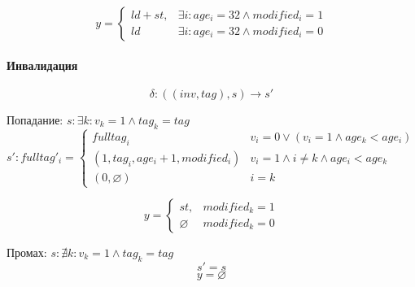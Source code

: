 \[
y =
\begin{cases}
	ld+st, & \exists i : age_i = 32 \land modified_i = 1 \\
	ld & \exists i : age_i = 32 \land modified_i = 0
\end{cases}
\]

\paragraph*{Инвалидация}

$$\delta : ((inv,tag),s) \rightarrow s'$$

Попадание: $s: \exists k : v_k = 1 \land tag_k = tag$
\[
s':fulltag'_i =
\begin{cases}
	fulltag_i & v_i = 0 \lor (v_i = 1 \land age_k < age_i)\\
	(1,tag_i,age_{i}+1,modified_i) & v_i = 1 \land i \neq k \land age_i < age_k \\
	(0,\varnothing) & i = k
\end{cases}
\]

\[
y =
\begin{cases}
	st, & modified_k = 1 \\
	\varnothing & modified_k = 0
\end{cases}
\]

Промах: $s: \nexists k : v_k = 1 \land tag_k = tag$
$$s' = s$$
$$y = \varnothing$$



